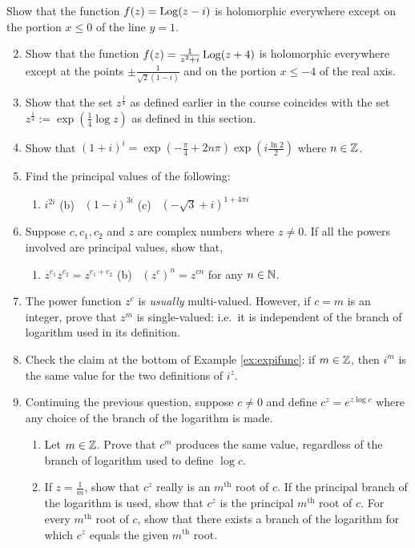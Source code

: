 \begin{exercises}
	\exstart Show that the function $f(z)=\operatorname{Log}(z-i)$ is holomorphic everywhere except on the portion $x\le 0$ of the line $y=1$.
	\begin{enumerate}\setcounter{enumi}{1}
  	\item Show that the function $f(z)=\frac 1{z^2+i}\operatorname{Log}(z+4)$ is holomorphic everywhere except at the points $\pm\frac 1{\sqrt 2(1-i)}$ and on the portion $x\le -4$ of the real axis.

  
  	\item Show that the set $z^{\frac 14}$ as defined earlier in the course coincides with the set $z^{\frac 14}:=\exp\left(\frac 14\log z\right)$ as defined in this section.
  
  	\item Show that $(1+i)^i=\exp\left(-\frac \pi 4+2n\pi\right)\exp\left(i\frac{\ln 2}2\right)$ where $n\in\mathbb{Z}$.
  
	  \item Find the principal values of the following:
	  \begin{enumerate}
	  	\item $i^{2i}$\qquad
	  	(b) \ $(1-i)^{3i}$\qquad
	  	(c) \ $(-\sqrt 3+i)^{1+4\pi i}$
	  \end{enumerate}
  
  
  	\item Suppose $c,c_1,c_2$ and $z$ are complex numbers where $z\neq 0$. If all the powers involved are principal values, show that,
	  \begin{enumerate}
	  	\item $z^{c_1}z^{c_2}=z^{c_1+c_2}$\qquad
	  	(b) \ $(z^c)^n=z^{cn}$ for any $n\in\mathbb{N}$.
	  \end{enumerate}
	  
	  \item The power function $z^c$ is \emph{usually} multi-valued. However, if $c=m$ is an integer, prove that $z^m$ is single-valued: i.e.\ it is independent of the branch of logarithm used in its definition.
	  
	  \item Check the claim at the bottom of Example \ref{ex:expifunc}: if $m\in\mathbb{Z}$, then $i^m$ is the same value for the two definitions of $i^z$.
	  
	  \item Continuing the previous question, suppose $c\neq 0$ and define $c^z=e^{z\log c}$ where any choice of the branch of the logarithm is made.
	  \begin{enumerate}
	    \item Let $m\in\mathbb{Z}$. Prove that $c^m$ produces the same value, regardless of the branch of logarithm used to define $\log c$.
	    \item If $z=\frac 1m$, show that $c^z$ really is an $m^\text{th}$ root of $c$. If the principal branch of the logarithm is used, show that $c^z$ is the principal $m^\text{th}$ root of $c$. For every $m^\text{th}$ root of $c$, show that there exists a branch of the logarithm for which $c^z$ equals the given $m^\text{th}$ root.
	  \end{enumerate}
	   
	\end{enumerate}
\end{exercises}
